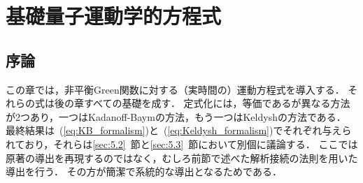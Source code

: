 \documentclass[a4paper,10pt]{jsarticle}
\begin{document}
\section{基礎量子運動学的方程式}
\subsection{\label{sec:5.1}序論}
この章では，非平衡Green関数に対する（実時間の）運動方程式を導入する．
それらの式は後の章すべての基礎を成す．
定式化には，等価であるが異なる方法が2つあり，一つはKadanoff-Baymの方法，もう一つはKeldyshの方法である．
最終結果は~(\ref{eq:KB_formalism})と~(\ref{eq:Keldysh_formalism})でそれぞれ与えられており，それらは\ref{sec:5.2}~節と\ref{sec:5.3}~節において別個に議論する．
ここでは原著の導出を再現するのではなく，むしろ前節で述べた解析接続の法則を用いた導出を行う．
その方が簡潔で系統的な導出となるためである．

\end{document}
